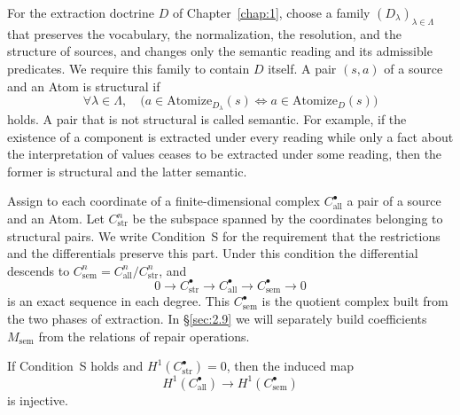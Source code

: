 \begin{definition}\label{def:2.30}

For the extraction doctrine $D$ of Chapter~\ref{chap:1}, choose a family
$(D_\lambda)_{\lambda\in\Lambda}$ that preserves the vocabulary, the normalization, the
resolution, and the structure of sources, and changes only the semantic reading and its
admissible predicates. We require this family to contain $D$ itself. A pair $(s,a)$ of a
source and an Atom is structural if
\begin{equation*}
\forall\lambda\in\Lambda,\quad
\bigl(a\in\mathrm{Atomize}_{D_\lambda}(s)
\Longleftrightarrow a\in\mathrm{Atomize}_D(s)\bigr)
\tag{2.20}\label{eq:2.20}
\end{equation*}
holds. A pair that is not structural is called semantic. For example, if the existence of
a component is extracted under every reading while only a fact about the interpretation
of values ceases to be extracted under some reading, then the former is structural and
the latter semantic.

\end{definition}

\begin{definition}\label{def:2.31}

Assign to each coordinate of a finite-dimensional complex $C^\bullet_{\mathrm{all}}$ a
pair of a source and an Atom. Let $C^n_{\mathrm{str}}$ be the subspace spanned by the
coordinates belonging to structural pairs. We write Condition~S for the requirement that the
restrictions and the differentials preserve this part. Under this condition the
differential descends to $C^n_{\mathrm{sem}}=C^n_{\mathrm{all}}/C^n_{\mathrm{str}}$, and
\begin{equation*}
0\longrightarrow C^\bullet_{\mathrm{str}}
\longrightarrow C^\bullet_{\mathrm{all}}
\longrightarrow C^\bullet_{\mathrm{sem}}\longrightarrow0
\tag{2.21}\label{eq:2.21}
\end{equation*}
is an exact sequence in each degree. This $C^\bullet_{\mathrm{sem}}$ is the quotient
complex built from the two phases of extraction. In \S\ref{sec:2.9} we will separately
build coefficients $M_{\mathrm{sem}}$ from the relations of repair operations.

\end{definition}

\begin{proposition}\label{prop:2.32}

If Condition~S holds and $H^1(C^\bullet_{\mathrm{str}})=0$, then the induced map
\begin{equation*}
H^1(C^\bullet_{\mathrm{all}})
\longrightarrow H^1(C^\bullet_{\mathrm{sem}})
\tag{2.22}\label{eq:2.22}
\end{equation*}
is injective.

\end{proposition}

